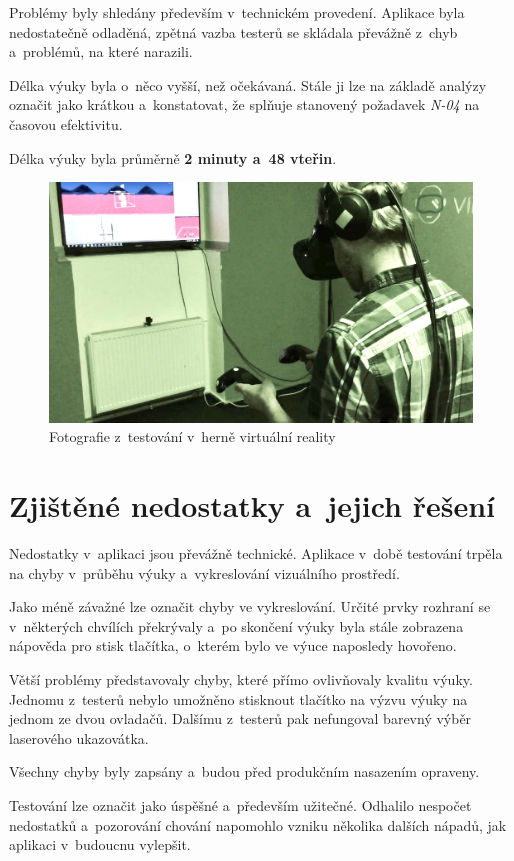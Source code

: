 Problémy byly shledány především v~technickém provedení. Aplikace 
byla nedostatečně odladěná, zpětná vazba testerů se skládala 
převážně z~chyb a~problémů, na které narazili.

Délka výuky byla o~něco vyšší, než očekávaná. Stále ji lze na základě analýzy označit
jako krátkou a~konstatovat, že splňuje stanovený požadavek \emph{N-04} na časovou efektivitu.

Délka výuky byla průměrně \textbf{2 minuty a~48 vteřin}.

\begin{figure}[h!]
\centering
\includegraphics[width=12cm]{src/assets/testing.jpg}
\caption{Fotografie z~testování v~herně virtuální reality}
\end{figure}

\section{Zjištěné nedostatky a~jejich řešení}\label{zjiux161tux11bnuxe9-nedostatky}

Nedostatky v~aplikaci jsou převážně technické. Aplikace v~době testování trpěla na
chyby v~průběhu výuky a~vykreslování vizuálního prostředí.

Jako méně závažné lze označit chyby ve vykreslování. Určité prvky rozhraní se v~některých
chvílích překrývaly a~po skončení výuky byla stále zobrazena nápověda pro stisk
tlačítka, o~kterém bylo ve výuce naposledy hovořeno.

Větší problémy představovaly chyby, které přímo ovlivňovaly kvalitu 
výuky. Jednomu z~testerů nebylo umožněno stisknout tlačítko na výzvu 
výuky na jednom ze dvou ovladačů. Dalšímu z~testerů pak nefungoval 
barevný výběr laserového ukazovátka.

Všechny chyby byly zapsány a~budou před produkčním nasazením opraveny.

Testování lze označit jako úspěšné a~především užitečné. Odhalilo 
nespočet nedostatků a~pozorování chování napomohlo vzniku
několika dalších nápadů, jak aplikaci v~budoucnu vylepšit.